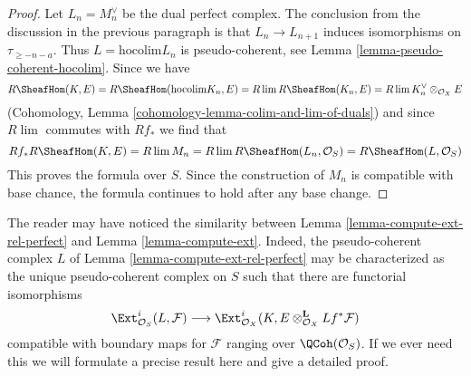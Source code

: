 \begin{proof}
\medskip\noindent
Let $L_n = M_n^\vee$ be the dual perfect complex. The
conclusion from the discussion in the previous paragraph is that
$L_n \to L_{n + 1}$ induces isomorphisms on $\tau_{\geq -n - a}$.
Thus $L = \text{hocolim} L_n$ is pseudo-coherent, see
Lemma \ref{lemma-pseudo-coherent-hocolim}.
Since we have
$$
R\SheafHom(K, E) = R\SheafHom(\text{hocolim} K_n, E) =
R\lim R\SheafHom(K_n, E) = R\lim K_n^\vee \otimes_{\mathcal{O}_X} E
$$
(Cohomology, Lemma \ref{cohomology-lemma-colim-and-lim-of-duals})
and since $R\lim$ commutes with $Rf_*$ we find that
$$
Rf_*R\SheafHom(K, E) = R\lim M_n = R\lim R\SheafHom(L_n, \mathcal{O}_S) =
R\SheafHom(L, \mathcal{O}_S)
$$
This proves the formula over $S$. Since the construction of $M_n$ is
compatible with base chance, the formula continues to hold after
any base change.
\end{proof}

\begin{remark}
\label{remark-compare-L}
The reader may have noticed the similarity between
Lemma \ref{lemma-compute-ext-rel-perfect} and
Lemma \ref{lemma-compute-ext}.
Indeed, the pseudo-coherent complex $L$ of
Lemma \ref{lemma-compute-ext-rel-perfect}
may be characterized as the unique pseudo-coherent complex
on $S$ such that there are functorial isomorphisms
$$
\Ext^i_{\mathcal{O}_S}(L, \mathcal{F}) \longrightarrow
\Ext^i_{\mathcal{O}_X}(K,
E \otimes_{\mathcal{O}_X}^\mathbf{L} Lf^*\mathcal{F})
$$
compatible with boundary maps for $\mathcal{F}$ ranging over
$\QCoh(\mathcal{O}_S)$. If we ever need this we will
formulate a precise result here and give a detailed proof.
\end{remark}

